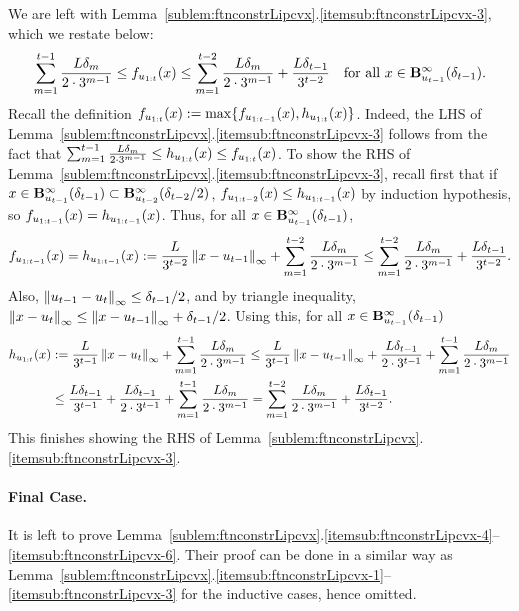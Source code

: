 We are left with Lemma~\ref{sublem:ftnconstrLipcvx}.\ref{itemsub:ftnconstrLipcvx-3}, which we restate below:
\begin{equation*}
\sum_{m=1}^{t-1} \frac{L\delta_m}{2\cdot3^{m-1}}
\leq
f_{u_{1:{t}}} (x)
\leq
\sum_{m=1}^{t-2} \frac{L\delta_m}{2\cdot3^{m-1}} +\frac{L\delta_{t-1}}{3^{t-2}}
\quad \text{for all } x \in \mathbf{B}^\infty_{u_{t-1}}({\delta_{t-1}}).
\end{equation*}
Recall the definition $f_{u_{1:{t}}} (x) := \max \{ f_{u_{1:{t-1}}} (x), h_{u_{1:{t}}} (x) \}$.
Indeed, the LHS of Lemma~\ref{sublem:ftnconstrLipcvx}.\ref{itemsub:ftnconstrLipcvx-3} follows from the fact that 
$\sum_{m=1}^{t-1} \frac{L\delta_m}{2\cdot3^{m-1}} \leq h_{u_{1:{t}}}(x) \leq f_{u_{1:{t}}}(x)$.
To show the RHS of Lemma~\ref{sublem:ftnconstrLipcvx}.\ref{itemsub:ftnconstrLipcvx-3}, recall first that if
$x \in \mathbf{B}^\infty_{u_{t-1}}({\delta_{t-1}}) \subset \mathbf{B}^\infty_{u_{t-2}}({\delta_{t-2}/2})$,
$f_{u_{1:{t-2}}}(x) \leq h_{u_{1:{t-1}}} (x)$ by induction hypothesis, so $f_{u_{1:{t-1}}} (x) = h_{u_{1:{t-1}}} (x)$.
Thus, for all $x \in \mathbf{B}^\infty_{u_{t-1}}({\delta_{t-1}})$,
\begin{equation*}
f_{u_{1:{t-1}}} (x)
= 
h_{u_{1:{t-1}}}(x)
:= 
\frac{L}{3^{t-2}} \left\|{x-u_{t-1}}\right\|_\infty + \sum_{m=1}^{t-2} \frac{L \delta_m}{2 \cdot 3^{m-1}}
\leq
\sum_{m=1}^{t-2} \frac{L\delta_m}{2\cdot3^{m-1}} +\frac{L\delta_{t-1}}{3^{t-2}}.
\end{equation*}
Also, $\left\|{u_{t-1} - u_t}\right\|_\infty \leq \delta_{t-1}/2$, and by triangle inequality, $\left\|{x-u_{t}}\right\|_\infty \leq \left\|{x - u_{t-1}}\right\|_\infty + \delta_{t-1}/2$.
Using this, for all $x \in \mathbf{B}^\infty_{u_{t-1}}({\delta_{t-1}})$
\begin{align*}
h_{u_{1:{t}}}(x)
&:= 
\frac{L}{3^{t-1}} \left\|{x-u_{t}}\right\|_\infty + \sum_{m=1}^{t-1} \frac{L \delta_m}{2 \cdot 3^{m-1}}
\leq
\frac{L}{3^{t-1}} \left\|{x-u_{t-1}}\right\|_\infty + \frac{L \delta_{t-1}}{2 \cdot 3^{t-1}} + \sum_{m=1}^{t-1} \frac{L \delta_m}{2 \cdot 3^{m-1}}\\
&
\leq
\frac{L \delta_{t-1}}{3^{t-1}} + \frac{L \delta_{t-1}}{2 \cdot 3^{t-1}} + \sum_{m=1}^{t-1} \frac{L \delta_m}{2 \cdot 3^{m-1}}
=
\sum_{m=1}^{t-2} \frac{L\delta_m}{2\cdot3^{m-1}} +\frac{L\delta_{t-1}}{3^{t-2}}.
\end{align*}
This finishes showing the RHS of Lemma~\ref{sublem:ftnconstrLipcvx}.\ref{itemsub:ftnconstrLipcvx-3}.

\paragraph{Final Case.}
It is left to prove Lemma~\ref{sublem:ftnconstrLipcvx}.\ref{itemsub:ftnconstrLipcvx-4}--\ref{itemsub:ftnconstrLipcvx-6}. 
Their proof can be done in a similar way as Lemma~\ref{sublem:ftnconstrLipcvx}.\ref{itemsub:ftnconstrLipcvx-1}--\ref{itemsub:ftnconstrLipcvx-3} for the inductive cases, hence omitted.

